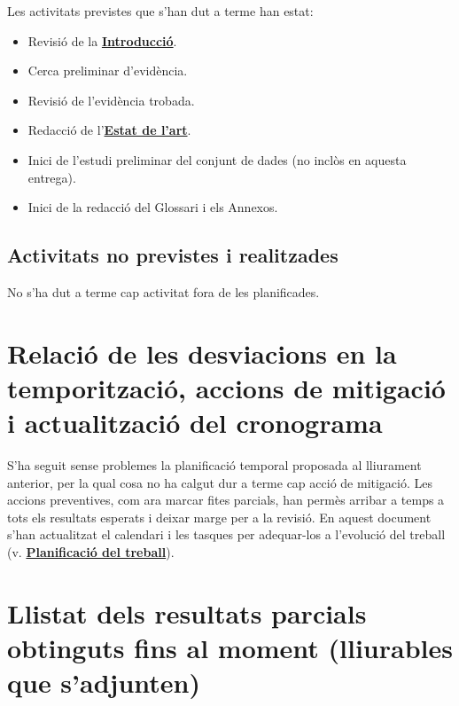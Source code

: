 \documentclass[CAT]{TFUOC}%
\providecommand{\tightlist}{\setlength{\itemsep}{0pt}\setlength{\parskip}{0pt}}
\begin{document}
Les activitats previstes que s'han dut a terme han estat:

\begin{itemize}
\tightlist
\item
  Revisió de la \textbf{\hyperref[introducciuxf3]{Introducció}}.
\item
  Cerca preliminar d'evidència.
\item
  Revisió de l'evidència trobada.
\item
  Redacció de l'\textbf{\hyperref[estat-de-lart]{Estat de l'art}}.
\item
  Inici de l'estudi preliminar del conjunt de dades (no inclòs en aquesta entrega).
\item
  Inici de la redacció del Glossari i els Annexos.
\end{itemize}

\subsection{Activitats no previstes i realitzades}\label{activitats-no-previstes-i-realitzades}

No s'ha dut a terme cap activitat fora de les planificades.

\section{Relació de les desviacions en la temporització, accions de mitigació i actualització del cronograma}\label{relaciuxf3-de-les-desviacions-en-la-temporitzaciuxf3-accions-de-mitigaciuxf3-i-actualitzaciuxf3-del-cronograma}

S'ha seguit sense problemes la planificació temporal proposada al lliurament anterior, per la qual cosa no ha calgut dur a terme cap acció de mitigació. Les accions preventives, com ara marcar fites parcials, han permès arribar a temps a tots els resultats esperats i deixar marge per a la revisió. En aquest document s'han actualitzat el calendari i les tasques per adequar-los a l'evolució del treball (v. \textbf{\hyperref[planificaciuxf3-del-treball]{Planificació del treball}}).

\section{Llistat dels resultats parcials obtinguts fins al moment (lliurables que s'adjunten)}\label{llistat-dels-resultats-parcials-obtinguts-fins-al-moment-lliurables-que-sadjunten}
\end{document}
